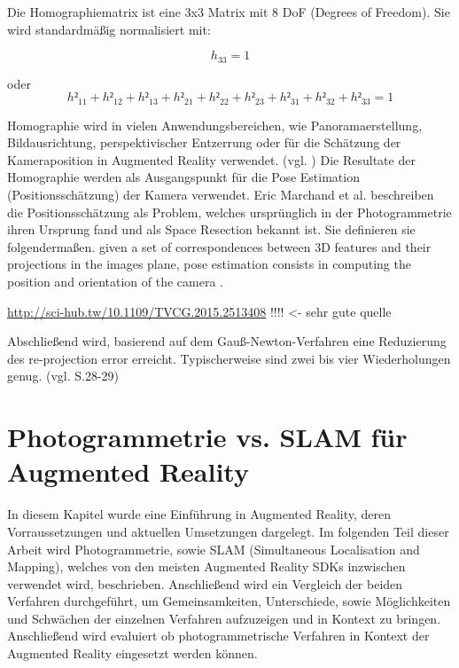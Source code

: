 Die Homographiematrix ist eine 3x3 Matrix mit 8 DoF (Degrees of Freedom). Sie wird standardmäßig normalisiert mit: 

\begin{equation}
h_33 = 1
\end{equation}

oder 
\begin{equation}
h²_{11} + h²_{12} + h²_{13} + h²_{21} + h²_{22} + h²_{23} + h²_{31} + h²_{32} + h²_{33} = 1
\end{equation}

Homographie wird in vielen Anwendungsbereichen, wie Panoramaerstellung, Bildausrichtung, perspektivischer Entzerrung oder für die Schätzung der Kameraposition in Augmented Reality verwendet. (vgl. \cite{homography}) Die Resultate der Homographie werden als Ausgangspunkt für die \glqq Pose Estimation\grqq{} (Positionsschätzung) der Kamera verwendet.  Eric Marchand et al. \cite{natural_feature} beschreiben die Positionsschätzung als Problem, welches ursprünglich in der Photogrammetrie ihren Ursprung fand und als \glqq Space Resection\grqq{} bekannt ist. Sie definieren sie folgendermaßen. \glqq given a set of correspondences between 3D
features and their projections in the images plane, pose estimation
consists in computing the position and orientation of the camera \grqq{}.

\url{http://sci-hub.tw/10.1109/TVCG.2015.2513408} !!!! <- sehr gute quelle

 Abschließend wird, basierend auf dem Gauß-Newton-Verfahren eine Reduzierung des \glqq re-projection error\grqq{} erreicht. Typischerweise sind zwei bis vier Wiederholungen genug. (vgl. \cite{natural_feature} S.28-29)

\section{Photogrammetrie vs. SLAM für Augmented Reality}

In diesem Kapitel wurde eine Einführung in Augmented Reality, deren Vorraussetzungen und aktuellen Umsetzungen dargelegt. Im folgenden Teil dieser Arbeit wird Photogrammetrie, sowie SLAM (Simultaneous Localisation and Mapping), welches von den meisten Augmented Reality SDKs inzwischen verwendet wird, beschrieben. Anschließend wird ein Vergleich der beiden Verfahren durchgeführt, um Gemeinsamkeiten, Unterschiede, sowie Möglichkeiten und Schwächen der einzelnen Verfahren aufzuzeigen und in Kontext zu bringen. Anschließend wird evaluiert ob photogrammetrische Verfahren in Kontext der Augmented Reality eingesetzt werden können.

